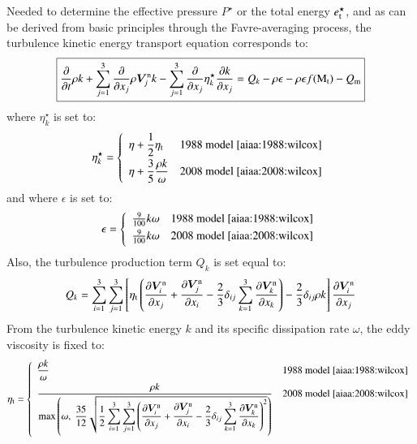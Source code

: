 \documentclass{warpdoc}
\newcommand\frameeqn[1]{\fbox{$\displaystyle #1$}}
\newcommand{\alb}{\vspace{0.1cm}\\} %
\newcommand{\mfd}{\displaystyle}
\newcommand{\visc}{\eta}
\renewcommand{\vec}[1]{\bm{#1}}
\begin{document}
Needed to determine the effective pressure $P^\star$ or the total energy $e_{\rm t}^\star$, and as can be derived from basic principles through the Favre-averaging process, the turbulence kinetic energy transport equation corresponds to:
%
\begin{equation}
\frameeqn{
    \frac{\partial }{\partial t} \rho k
  + \sum_{j=1}^{3}\frac{\partial }{\partial x_j} \rho \vec{V}^{\rm n}_j k
  - \sum_{j=1}^{3} \frac{\partial }{\partial x_j}
     \visc_k^\star \frac{\partial k}{\partial x_j}
  =
  Q_k-\rho \epsilon -\rho\epsilon f({\rm M}_{\rm t})-Q_{\rm m}
}
\label{eqn:k}
\end{equation}
%
where $\visc_k^\star$ is set to:
%
\begin{equation}
\visc_k^\star = \left\{\begin{array}{ll}\mfd\visc  + \frac{1}{2}\visc_{\rm t} & \textrm{1988 model \cite{aiaa:1988:wilcox}} \alb
                                      \mfd \visc  +  \frac{3}{5} \frac{\rho k}{\omega} & \textrm{2008 model \cite{aiaa:2008:wilcox}}  \end{array} \right.
\end{equation}
%
and where $\epsilon$ is set to:
%
\begin{equation}
\epsilon= \left\{\begin{array}{ll}
                    \frac{9}{100} k\omega & \textrm{1988 model \cite{aiaa:1988:wilcox}} \alb
                    \frac{9}{100} k \omega & \textrm{2008 model \cite{aiaa:2008:wilcox}} \alb
                 \end{array} \right.
\end{equation}
%
Also, the turbulence production term $Q_k$ is set equal to:
%
\begin{equation}
  Q_k= \mfd\sum_{i=1}^3 \sum_{j=1}^{3}
         \left[ \visc_{\rm t} \left(
           \frac{\partial {\vec{V}^{\rm n}_i}}{\partial x_j}
           +\frac{\partial {\vec{V}^{\rm n}_j}}{\partial x_i}
           -\frac{2}{3} \delta_{ij} \sum_{k=1}^3 \frac{\partial {\vec{V}^{\rm n}_k}}{\partial x_k}
            \right)
           - \frac{2}{3} \delta_{ij} {\rho} k
         \right]
         \frac{\partial {\vec{V}^{\rm n}_i}}{\partial x_j}
\label{eqn:Pk}
\end{equation}
%
From the turbulence kinetic energy $k$ and its specific dissipation rate $\omega$, the eddy viscosity is fixed to:
%
\begin{equation}
\visc_{\rm t}=\left\{
\begin{array}{ll}\mfd
\frac{\rho k}{\omega} & \textrm{1988 model \cite{aiaa:1988:wilcox}}\alb\mfd
\mfd \frac{\rho k}{{\rm max}\left(\omega,~\mfd\frac{35}{12}\sqrt{\frac{1}{2}\sum_{i=1}^3\sum_{j=1}^3\left(\frac{\partial \vec{V}^{\rm n}_i}{\partial x_j}+\frac{\partial \vec{V}^{\rm n}_j}{\partial x_i}-\frac{2}{3}\delta_{ij}\sum_{k=1}^{3} \frac{\partial \vec{V}^{\rm n}_k}{\partial x_k}\right)^2}\right)}
 & \textrm{2008 model \cite{aiaa:2008:wilcox}} \alb
\end{array}
\right.
\end{equation}
%
\end{document}
